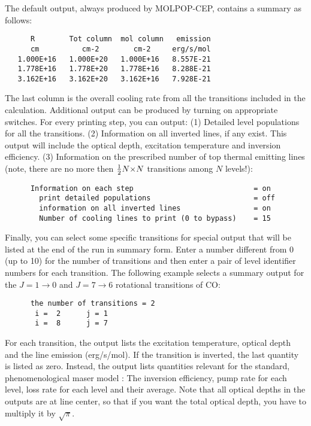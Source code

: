 \documentclass[12pt]{article}
\def\x        {\hbox{$\times$}}
\def\half     {\hbox{$1\over2$}}
\def\M{MOLPOP-CEP}
\begin{document}
The default output, always produced by \M, contains a summary as follows:
\begin{verbatim}
      R        Tot column  mol column   emission
      cm          cm-2        cm-2     erg/s/mol
   1.000E+16   1.000E+20   1.000E+16   8.557E-21
   1.778E+16   1.778E+20   1.778E+16   8.288E-21
   3.162E+16   3.162E+20   3.162E+16   7.928E-21
\end{verbatim}
The last column is the overall cooling rate from all the transitions included
in the calculation. Additional output can be produced by turning on appropriate
switches. For every printing step, you can output: (1) Detailed level
populations for all the transitions. (2) Information on all inverted lines, if
any exist. This output will include the optical depth, excitation temperature
and inversion efficiency. (3) Information on the prescribed number of top
thermal emitting lines (note, there are no more then $\half N\x N$ transitions
among $N$ levels!):
\begin{verbatim}
      Information on each step                            = on
        print detailed populations                        = off
        information on all inverted lines                 = on
        Number of cooling lines to print (0 to bypass)    = 15
\end{verbatim}
Finally, you can select some specific transitions for special output that will
be listed at the end of the run in summary form. Enter a number different from
0 (up to 10) for the number of transitions and then enter a pair of level
identifier numbers for each transition.  The following example selects a
summary output for the $J = 1 \to 0$ and $J = 7 \to 6$ rotational transitions
of CO:
\begin{verbatim}
      the number of transitions = 2
       i =  2      j = 1
       i =  8      j = 7
\end{verbatim}
For each transition, the output lists the excitation temperature, optical depth
and the line emission (erg/s/mol). If the transition is inverted, the last
quantity is listed as zero. Instead, the output lists quantities relevant for
the standard, phenomenological maser model \citep[see][]{elitzur92}: The
inversion efficiency, pump rate for each level, loss rate for each level and
their average. Note that all optical depths in the outputs are at line
center, so that if you want the total optical depth, you have to multiply
it by $\sqrt{\pi}$.
\end{document}
